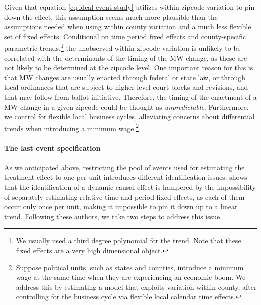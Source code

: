     Given that equation \eqref{eq:ideal-event-study} utilizes within zipcode variation to pin-down the effect, this assumption seems much more plausible than the assumptions needed when using within county variation and a much less flexible set of fixed effects. Conditional on time period fixed effects and county-specific parametric trends,\footnote{We usually used a third degree polynomial for the trend. Note that these fixed effects are a very high dimensional object.} the unobserved within zipcode variation is unlikely to be correlated with the determinants of the timing of the MW change, as these are not likely to be determined at the zipcode level. One important reason for this is that MW changes are usually enacted through federal or state law, or through local ordinances that are subject to higher level court blocks and revisions, and that may follow from ballot initiative. Therefore, the timing of the enactment of a MW change in a given zipcode could be thought as \textit{unpredictable}.
    Furthermore, we control for flexible local business cycles, alleviating concerns about differential trends when introducing a minimum wage.\footnote{Suppose political units, such as states and counties, introduce a minimum wage at the same time when they are experiencing an economic boom. We address this by estimating a model that exploits variation within county, after controlling for the business cycle via flexible local calendar time effects.}
    
    \paragraph{The last event specification}
    
    As we anticipated above, restricting the pool of events used for estimating the treatment effect to one per unit introduces different identification issues. \textcite{borusyak2017revisiting} shows that the identification of a dynamic causal effect is hampered by the impossibility of separately estimating relative time and period fixed effects, as each of them occur only once per unit, making it impossible to pin it down up to a linear trend. Following these authors, we take two steps to address this issue.
    
